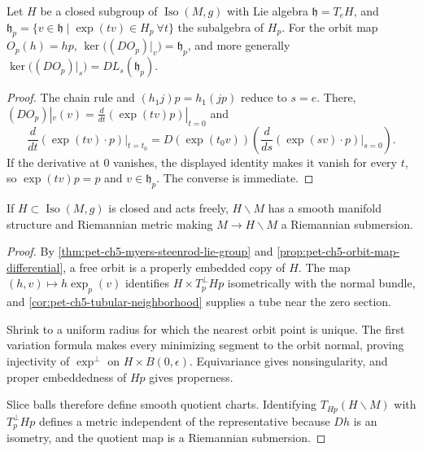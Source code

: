 \begin{proposition}
  \label{prop:pet-ch5-orbit-map-differential}
  Let $H$ be a closed subgroup of $\operatorname{Iso}(M,g)$ with Lie algebra
  $\mathfrak h=T_eH$, and $\mathfrak h_p=\{v\in\mathfrak h\mid\exp(tv)\in H_p\ \forall t\}$
  the subalgebra of $H_p$. For the orbit map $O_p(h)=hp$,
  $\ker\big((DO_p)|_v\big)=\mathfrak h_p$, and more generally
  $\ker\big((DO_p)|_s\big)=DL_s(\mathfrak h_p)$.
\end{proposition}
\begin{proof}
  \sketch
  The chain rule and $(h_1j)p=h_1(jp)$ reduce to $s=e$. There,
  $(DO_p)|_v(v)=\frac{d}{dt}(\exp(tv)p)|_{t=0}$ and
  \[
    \frac{d}{dt}(\exp(tv)\cdot p)\Big|_{t=t_0}
    =D(\exp(t_0v))\left(\frac{d}{ds}(\exp(sv)\cdot p)\Big|_{s=0}\right).
  \]
  If the derivative at $0$ vanishes, the displayed identity makes it vanish for
  every $t$, so $\exp(tv)p=p$ and $v\in\mathfrak h_p$. The converse is immediate.
\end{proof}

\begin{theorem}
  \label{thm:pet-ch5-free-slice-theorem}
  If $H\subset\operatorname{Iso}(M,g)$ is closed and acts freely, $H\backslash M$
  has a smooth manifold structure and Riemannian metric making $M\to H\backslash M$
  a Riemannian submersion.
\end{theorem}
\begin{proof}
  \sketch
  By \cref{thm:pet-ch5-myers-steenrod-lie-group} and
  \cref{prop:pet-ch5-orbit-map-differential}, a free orbit is a properly embedded
  copy of $H$.  The map $(h,v)\mapsto h\exp_p(v)$ identifies
  $H\times T_p^\perp Hp$ isometrically with the normal bundle, and
  \cref{cor:pet-ch5-tubular-neighborhood} supplies a tube near the zero section.

  Shrink to a uniform radius for which the nearest orbit point is unique.  The first
  variation formula makes every minimizing segment to the orbit normal, proving
  injectivity of $\exp^\perp$ on $H\times B(0,\epsilon)$.  Equivariance gives
  nonsingularity, and proper embeddedness of $Hp$ gives properness.

  Slice balls therefore define smooth quotient charts. Identifying
  $T_{Hp}(H\backslash M)$ with $T_p^\perp Hp$ defines a metric independent of the
  representative because $Dh$ is an isometry, and the quotient map is a Riemannian
  submersion.
\end{proof}

